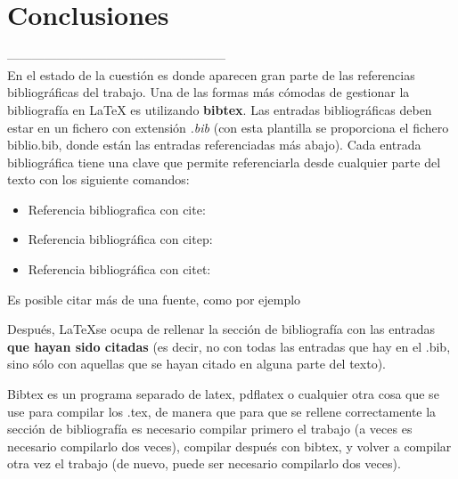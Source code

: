 \section{Conclusiones}
-----------------------------------------------------\\
En el estado de la cuestión es donde aparecen gran parte de las referencias bibliográficas del trabajo. Una de las formas más cómodas de gestionar la bibliografía en {\LaTeX} es utilizando \textbf{bibtex}. Las entradas bibliográficas deben estar en un fichero con extensión \textit{.bib} (con esta plantilla se proporciona el fichero biblio.bib, donde están las entradas referenciadas más abajo). Cada entrada bibliográfica tiene una clave que permite referenciarla desde cualquier parte del texto con los siguiente comandos:

\begin{itemize}
\item Referencia bibliografica con cite: \cite{ldesc2e}
\item Referencia bibliográfica con citep: \citep{notsoshort}
\item Referencia bibliográfica con citet: \citet{latexAPrimer}
\end{itemize}

Es posible citar más de una fuente, como por ejemplo \citep{latexCompanion,LaTeXLamport,texKnuth}

Después, \LaTeX se ocupa de rellenar la sección de bibliografía con las entradas \textbf{que hayan sido citadas} (es decir, no con todas las entradas que hay en el .bib, sino sólo con aquellas que se hayan citado en alguna parte del texto).

Bibtex es un programa separado de latex, pdflatex o cualquier otra cosa que se use para compilar los .tex, de manera que para que se rellene correctamente la sección de bibliografía es necesario compilar primero el trabajo (a veces es necesario compilarlo dos veces), compilar después con bibtex, y volver a compilar otra vez el trabajo (de nuevo, puede ser necesario compilarlo dos veces). 

